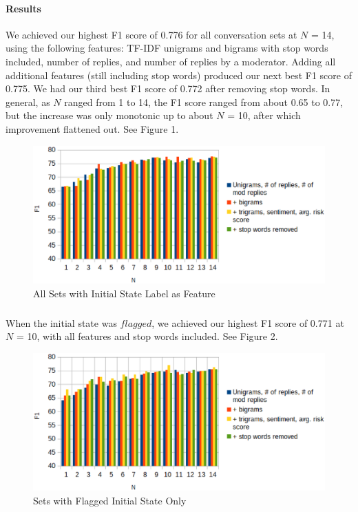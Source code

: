 \documentclass{article}
\begin{document}
\paragraph{Results}We achieved our highest F1 score of 0.776 for all conversation sets at $N$ = 14, using the following features: TF-IDF unigrams and bigrams with stop words included, number of replies, and number of replies by a moderator. Adding all additional features (still including stop words) produced our next best F1 score of 0.775. We had our third best F1 score of 0.772 after removing stop words. In general, as $N$ ranged from 1 to 14, the F1 score ranged from about 0.65 to 0.77, but the increase was only monotonic up to about $N$ = 10, after which improvement flattened out. See Figure 1.

\begin{figure}[h!]
    \includegraphics[width=14cm]{resultsAll}
    \caption{All Sets with Initial State Label as Feature}
\end{figure}

\subparagraph{}When the initial state was $flagged$, we achieved our highest F1 score of 0.771 at $N$ = 10, with all features and stop words included. See Figure 2.

\begin{figure}[h!]
    \includegraphics[width=14cm]{resultsFlagged}
    \caption{Sets with Flagged Initial State Only}
\end{figure}
\end{document}
